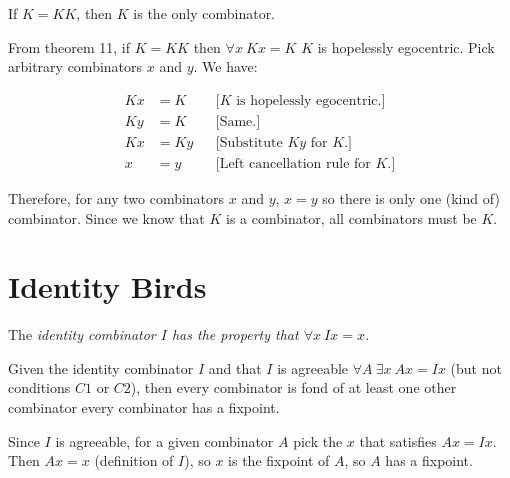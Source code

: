 \begin{thm}

If $K = KK$, then $K$ is the only combinator.

\bp

From theorem 11, if $K = KK$ then $\forall x\ Kx = K$ \ie $K$ is hopelessly
egocentric.  Pick arbitrary combinators $x$ and $y$.  We have:

\begin{align*}
Kx &= K && \text{[$K$ is hopelessly egocentric.]}  \\
Ky &= K && \text{[Same.]}  \\
Kx &= Ky && \text{[Substitute $Ky$ for $K$.]} \\
x &= y   && \text{[Left cancellation rule for $K$.]}
\end{align*}

Therefore, for any two combinators $x$ and $y$, $x = y$ so there is only one
(kind of) combinator.  Since we know that $K$ is a combinator, all combinators
must be $K$.  \qedhere

\ep

\end{thm}

\section{Identity Birds}


\begin{defn}

The \it{identity combinator} $I$ has the property that $\forall x\ Ix = x$.

\end{defn}


\begin{thm}

Given the identity combinator $I$ and that $I$ is agreeable \ie $\forall A\
\exists x\ Ax = Ix$ (but not conditions $C1$ or $C2$), then every combinator is
fond of at least one other combinator \ie every combinator has a fixpoint.  

\bp

Since $I$ is agreeable, for a given combinator $A$ pick the $x$ that satisfies
$Ax = Ix$.  Then $Ax = x$ (definition of $I$), so $x$ is the fixpoint of $A$, so
$A$ has a fixpoint.  \qedhere

\ep

\end{thm}

